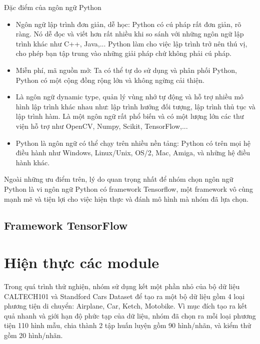 \documentclass[a4paper,14pt]{extreport}
\begin{document}
Đặc điểm của ngôn ngữ Python

\begin{itemize}
        \item Ngôn ngữ lập trình đơn giản, dễ học: Python có cú pháp rất đơn giản, rõ ràng. Nó dễ đọc và viết hơn rất nhiều khi so sánh với những ngôn ngữ lập trình khác như C++, Java,... Python làm cho việc lập trình trở nên thú vị, cho phép bạn tập trung vào những giải pháp chứ không phải cú pháp.
        \item Miễn phí, mã nguồn mở: Ta có thể tự do sử dụng và phân phối Python, Python có một cộng đồng rộng lớn và không ngừng cải thiện.
        \item Là ngôn ngữ dynamic type, quản lý vùng nhớ tự động và hỗ trợ nhiều mô hình lập trình khác nhau như: lập trình hướng đối tượng, lập trình thủ tục và lập trình hàm. Là một ngôn ngữ rất phổ biến và có một lượng lớn các thư viện hỗ trợ như OpenCV, Numpy, Scikit, TensorFlow,...
        \item Python là ngôn ngữ có thể chạy trên nhiều nền tảng: Python có trên mọi hệ điều hành như Windows, Linux/Unix, OS/2, Mac, Amiga, và những hệ điều hành khác.
\end{itemize}

Ngoài những ưu điểm trên, lý do quan trọng nhất để nhóm chọn ngôn ngữ Python là vi ngôn ngữ Python có framework Tensorflow, một framework vô cùng mạnh mẽ và tiện lợi cho việc hiện thực và đánh mô hình mà nhóm đã lựa chọn.

\subsection{Framework TensorFlow}



\section{Hiện thực các module}
Trong quá trình thử nghiện, nhóm sử dụng kết một phần nhỏ của bộ dữ liệu CALTECH101 và Standford Cars Dataset để tạo ra một bộ dữ liệu gồm 4 loại phương tiện di chuyển: Airplane, Car, Ketch, Motobike. Vì mục đích tạo ra kết quả nhanh và giới hạn độ phức tạp của dữ liệu, nhóm đã chọn ra mỗi loại phương tiện 110 hình mẫu, chia thành 2 tập huấn luyện gồm 90 hình/nhãn, và kiểm thử gồm 20 hình/nhãn.
\end{document}
